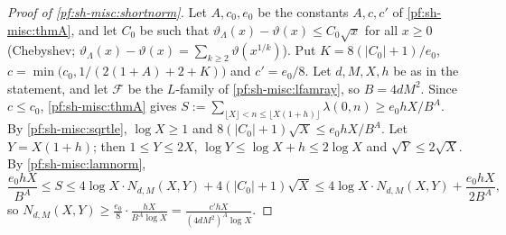 \begin{proof}[Proof of \cref{pf:sh-misc:shortnorm}]
Let $A,c_0,e_0$ be the constants $A,c,c'$ of \cref{pf:sh-misc:thmA}, and let $C_0$ be such that $\vartheta_\Lambda(x)-\vartheta(x)\le C_0\sqrt x$ for all
$x\ge0$ (Chebyshev; $\vartheta_\Lambda(x)-\vartheta(x)=\sum_{k\ge2}\vartheta(x^{1/k})$). Put $K=8(|C_0|+1)/e_0$,
$c=\min\bigl(c_0,1/(2(1+A)+2+K)\bigr)$ and $c'=e_0/8$. Let $d,M,X,h$ be as in the statement, and let $\mathcal F$ be the $L$-family of
\cref{pf:sh-misc:lfamray}, so $B=4dM^2$. Since $c\le c_0$, \cref{pf:sh-misc:thmA} gives $S:=\sum_{\lfloor X\rfloor<n\le\lfloor X(1+h)\rfloor}\lambda(0,n)\ge
e_0hX/B^A$. By \cref{pf:sh-misc:sqrtle}, $\log X\ge1$ and $8(|C_0|+1)\sqrt X\le e_0hX/B^A$. Let $Y=X(1+h)$; then $1\le Y\le2X$, $\log Y\le\log X+h\le
2\log X$ and $\sqrt Y\le2\sqrt X$. By \cref{pf:sh-misc:lamnorm},
\[
\frac{e_0hX}{B^A}\le S\le4\log X\cdot N_{d,M}(X,Y)+4(|C_0|+1)\sqrt X\le4\log X\cdot N_{d,M}(X,Y)+\frac{e_0hX}{2B^A},
\]
so $N_{d,M}(X,Y)\ge\frac{e_0}8\cdot\frac{hX}{B^A\log X}=\frac{c'hX}{(4dM^2)^A\log X}$.
\end{proof}

